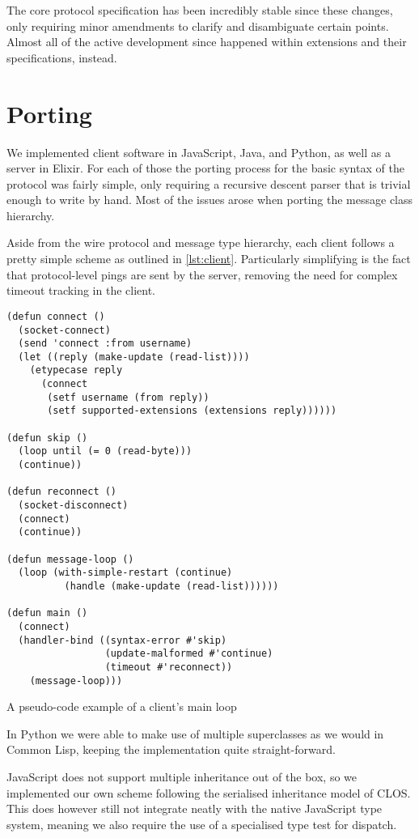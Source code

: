 \documentclass[format=sigconf]{acmart}
\begin{document}
The core protocol specification has been incredibly stable since these changes, only requiring minor amendments to clarify and disambiguate certain points. Almost all of the active development since happened within extensions and their specifications, instead.

\section{Porting}
We implemented client software in JavaScript, Java, and Python, as well as a server in Elixir. For each of those the porting process for the basic syntax of the protocol was fairly simple, only requiring a recursive descent parser that is trivial enough to write by hand. Most of the issues arose when porting the message class hierarchy.

Aside from the wire protocol and message type hierarchy, each client follows a pretty simple scheme as outlined in \autoref{lst:client}. Particularly simplifying is the fact that protocol-level pings are sent by the server, removing the need for complex timeout tracking in the client.

\begin{listing}
\begin{verbatim}
(defun connect ()
  (socket-connect)
  (send 'connect :from username)
  (let ((reply (make-update (read-list))))
    (etypecase reply
      (connect
       (setf username (from reply))
       (setf supported-extensions (extensions reply))))))

(defun skip ()
  (loop until (= 0 (read-byte)))
  (continue))

(defun reconnect ()
  (socket-disconnect)
  (connect)
  (continue))

(defun message-loop ()
  (loop (with-simple-restart (continue)
          (handle (make-update (read-list))))))

(defun main ()
  (connect)
  (handler-bind ((syntax-error #'skip)
                 (update-malformed #'continue)
                 (timeout #'reconnect))
    (message-loop)))
\end{verbatim}
\caption{A pseudo-code example of a client's main loop}
\label{lst:client}
\end{listing}

In Python we were able to make use of multiple superclasses as we would in Common Lisp, keeping the implementation quite straight-forward.

JavaScript does not support multiple inheritance out of the box, so we implemented our own scheme following the serialised inheritance model of CLOS. This does however still not integrate neatly with the native JavaScript type system, meaning we also require the use of a specialised type test for dispatch.
\end{document}
